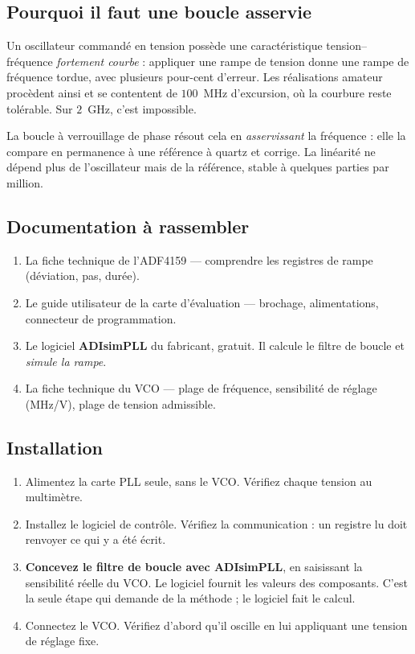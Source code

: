 \subsection{Pourquoi il faut une boucle asservie}

Un oscillateur commandé en tension possède une caractéristique
tension--fréquence \emph{fortement courbe} : appliquer une rampe de tension
donne une rampe de fréquence tordue, avec plusieurs pour-cent d'erreur. Les
réalisations amateur procèdent ainsi et se contentent de $100$~MHz d'excursion,
où la courbure reste tolérable. Sur $2$~GHz, c'est impossible.

La boucle à verrouillage de phase résout cela en \emph{asservissant} la
fréquence : elle la compare en permanence à une référence à quartz et corrige.
La linéarité ne dépend plus de l'oscillateur mais de la référence, stable à
quelques parties par million.

\subsection{Documentation à rassembler}

\begin{enumerate}[nosep]
\item La fiche technique de l'ADF4159 --- comprendre les registres de rampe
      (déviation, pas, durée).
\item Le guide utilisateur de la carte d'évaluation --- brochage,
      alimentations, connecteur de programmation.
\item Le logiciel \textbf{ADIsimPLL} du fabricant, gratuit. Il calcule le filtre
      de boucle et \emph{simule la rampe}.
\item La fiche technique du VCO --- plage de fréquence, sensibilité de réglage
      (MHz/V), plage de tension admissible.
\end{enumerate}

\subsection{Installation}

\begin{enumerate}
\item Alimentez la carte PLL seule, sans le VCO. Vérifiez chaque tension au
      multimètre.
\item Installez le logiciel de contrôle. Vérifiez la communication : un
      registre lu doit renvoyer ce qui y a été écrit.
\item \textbf{Concevez le filtre de boucle avec ADIsimPLL}, en saisissant la
      sensibilité réelle du VCO. Le logiciel fournit les valeurs des composants.
      C'est la seule étape qui demande de la méthode ; le logiciel fait le
      calcul.
\item Connectez le VCO. Vérifiez d'abord qu'il oscille en lui appliquant une
      tension de réglage fixe.
\end{enumerate}

